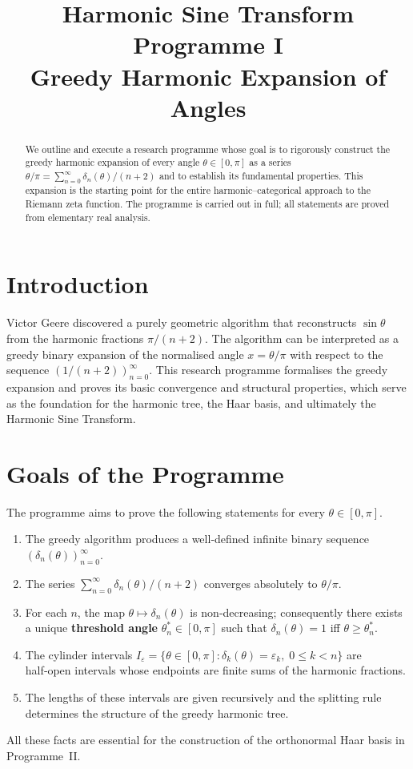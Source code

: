 \documentclass[11pt,a4paper]{article}
\title{\bfseries Harmonic Sine Transform Programme I\\
\large Greedy Harmonic Expansion of Angles}
\author{}
\date{}
\begin{document}
\maketitle

\begin{abstract}
We outline and execute a research programme whose goal is to rigorously construct the greedy harmonic expansion of every angle \(\theta\in[0,\pi]\) as a series \(\theta/\pi = \sum_{n=0}^\infty \delta_n(\theta)/(n+2)\) and to establish its fundamental properties. This expansion is the starting point for the entire harmonic–categorical approach to the Riemann zeta function. The programme is carried out in full; all statements are proved from elementary real analysis.
\end{abstract}

\section{Introduction}
Victor Geere \cite{Geere2026a} discovered a purely geometric algorithm that reconstructs \(\sin\theta\) from the harmonic fractions \(\pi/(n+2)\).  The algorithm can be interpreted as a greedy binary expansion of the normalised angle \(x = \theta/\pi\) with respect to the sequence \((1/(n+2))_{n=0}^\infty\).  This research programme formalises the greedy expansion and proves its basic convergence and structural properties, which serve as the foundation for the harmonic tree, the Haar basis, and ultimately the Harmonic Sine Transform.

\section{Goals of the Programme}
The programme aims to prove the following statements for every \(\theta\in[0,\pi]\).
\begin{enumerate}
\item The greedy algorithm produces a well‑defined infinite binary sequence \((\delta_n(\theta))_{n=0}^\infty\).
\item The series \(\sum_{n=0}^\infty \delta_n(\theta)/(n+2)\) converges absolutely to \(\theta/\pi\).
\item For each \(n\), the map \(\theta\mapsto\delta_n(\theta)\) is non‑decreasing; consequently there exists a unique \textbf{threshold angle} \(\theta_n^*\in[0,\pi]\) such that \(\delta_n(\theta)=1\) iff \(\theta\ge\theta_n^*\).
\item The cylinder intervals \(I_\varepsilon = \{\theta\in[0,\pi] : \delta_k(\theta)=\varepsilon_k,\;0\le k<n\}\) are half‑open intervals whose endpoints are finite sums of the harmonic fractions.
\item The lengths of these intervals are given recursively and the splitting rule determines the structure of the greedy harmonic tree.
\end{enumerate}
All these facts are essential for the construction of the orthonormal Haar basis in Programme~II.
\end{document}
